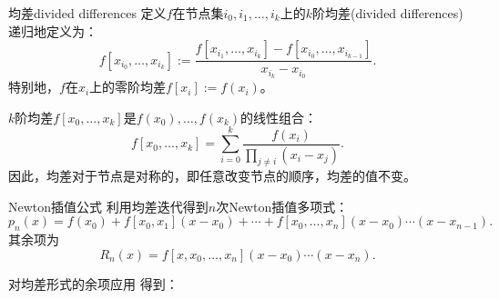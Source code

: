 \begin{definition}
    {均差}{divided differences}
    定义$f$在节点集$i_0,i_1,\ldots,i_k$上的$k$阶均差(divided differences)递归地定义为：
    \begin{equation}
        f[x_{i_0},\ldots,x_{i_k}] := \frac{f[x_{i_1},\ldots,x_{i_k}] - f[x_{i_0},\ldots,x_{i_{k-1}}]}{x_{i_k} - x_{i_0}}.
    \end{equation}
    特别地，$f$在$x_i$上的零阶均差$f[x_i] := f(x_i)$。
\end{definition}

\begin{corollary}
    $k$阶均差$f[x_0,\ldots,x_k]$是$f(x_0),\ldots,f(x_k)$的线性组合：
    \begin{equation}
        f[x_0,\ldots,x_k] = \sum_{i=0}^k\frac{f(x_i)}{\prod_{j\neq i}(x_i - x_j)}.
    \end{equation}
    因此，均差对于节点是对称的，即任意改变节点的顺序，均差的值不变。
\end{corollary}


\begin{theorem}
    {Newton插值公式}{}
    利用均差迭代得到$n$次Newton插值多项式：
    \begin{equation}
        p_n(x) = f(x_0) + f[x_0,x_1](x - x_0) + \cdots + f[x_0,\ldots,x_n](x - x_0)\cdots(x - x_{n-1}).
    \end{equation}
    其余项为
    \begin{equation}
        R_n(x) = f[x,x_0,\ldots,x_n](x - x_0)\cdots(x - x_n).
    \end{equation}
\end{theorem}

对均差形式的余项应用 得到：

